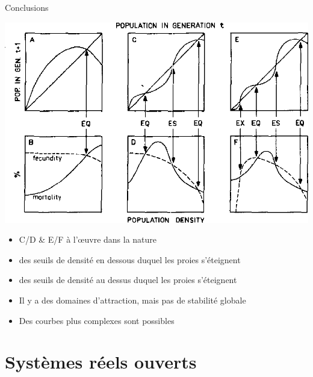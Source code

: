 \documentclass[11,aspectratio=1610]{beamer}
\begin{document}
\begin{frame}{Conclusions}


\centering
\includegraphics[height=0.5\textheight]{img/reproduction_curves.png}
\begin{footnotesize}
\begin{itemize}
\item C/D \& E/F à l’œuvre dans la nature   
\item des seuils de densité  \alert{en dessous duquel} les proies s'éteignent 
\item des seuils de densité  \alert{au dessus duquel} les proies s'éteignent 
\item Il y a des domaines d'attraction, mais pas de stabilité globale 
\item Des courbes plus complexes sont possibles 
\end{itemize}

  \end{footnotesize}

\end{frame}






\section{Systèmes réels ouverts}
\end{document}
